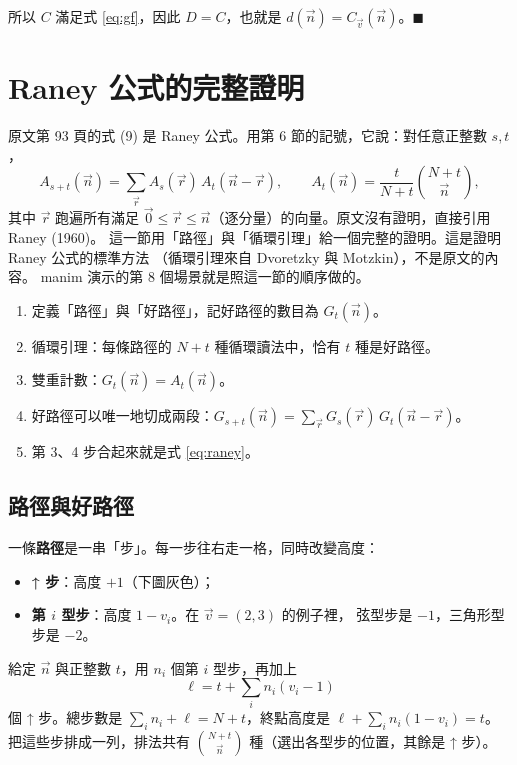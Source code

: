 \documentclass[11pt,a4paper]{article}
\newcommand{\vn}{\vec n}
\newcommand{\vv}{\vec v}
\newcommand{\vr}{\vec r}
\newcommand{\Cv}{C_{\vv}}
\begin{document}
所以 $C$ 滿足式 \eqref{eq:gf}，因此 $D=C$，也就是 $d(\vn)=\Cv(\vn)$。\hfill$\blacksquare$

\section{Raney 公式的完整證明}\label{sec:raney}

原文第 93 頁的式 (9) 是 Raney 公式。用第 6 節的記號，它說：對任意正整數 $s,t$，
\begin{equation}\label{eq:raney}
A_{s+t}(\vn)=\sum_{\vr}A_s(\vr)\,A_t(\vn-\vr),
\qquad A_t(\vn)=\frac{t}{N+t}\binom{N+t}{\vn},
\end{equation}
其中 $\vr$ 跑遍所有滿足 $\vec0\le\vr\le\vn$（逐分量）的向量。原文沒有證明，直接引用 Raney (1960)。
這一節用「路徑」與「循環引理」給一個完整的證明。這是證明 Raney 公式的標準方法
（循環引理來自 Dvoretzky 與 Motzkin），不是原文的內容。
manim 演示的第 8 個場景就是照這一節的順序做的。

\begin{keybox}[證明的骨架]
\begin{enumerate}[leftmargin=1.6em]
  \item 定義「路徑」與「好路徑」，記好路徑的數目為 $G_t(\vn)$。
  \item 循環引理：每條路徑的 $N+t$ 種循環讀法中，恰有 $t$ 種是好路徑。
  \item 雙重計數：$G_t(\vn)=A_t(\vn)$。
  \item 好路徑可以唯一地切成兩段：$G_{s+t}(\vn)=\sum_{\vr}G_s(\vr)\,G_t(\vn-\vr)$。
  \item 第 3、4 步合起來就是式 \eqref{eq:raney}。
\end{enumerate}
\end{keybox}

\subsection{路徑與好路徑}

一條\textbf{路徑}是一串「步」。每一步往右走一格，同時改變高度：
\begin{itemize}
  \item \textbf{↑ 步}：高度 $+1$（下圖灰色）；
  \item \textbf{第 $i$ 型步}：高度 $1-v_i$。在 $\vv=(2,3)$ 的例子裡，
        \textcolor{cA}{弦型步}是 $-1$，\textcolor{cB}{三角形型步}是 $-2$。
\end{itemize}
給定 $\vn$ 與正整數 $t$，用 $n_i$ 個第 $i$ 型步，再加上
\[
\ell=t+\sum_{i}n_i(v_i-1)
\]
個 ↑ 步。總步數是 $\sum_i n_i+\ell=N+t$，終點高度是 $\ell+\sum_i n_i(1-v_i)=t$。
把這些步排成一列，排法共有 $\binom{N+t}{\vn}$ 種（選出各型步的位置，其餘是 ↑ 步）。
\end{document}
